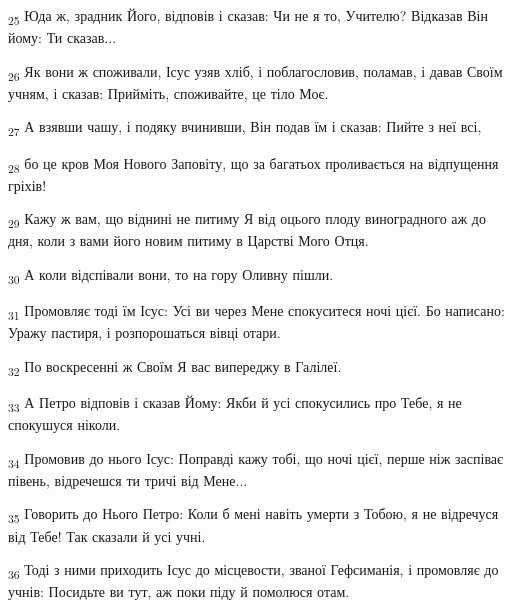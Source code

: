 \begin{tcolorbox}
\textsubscript{25} Юда ж, зрадник Його, відповів і сказав: Чи не я то, Учителю? Відказав Він йому: Ти сказав...
\end{tcolorbox}
\begin{tcolorbox}
\textsubscript{26} Як вони ж споживали, Ісус узяв хліб, і поблагословив, поламав, і давав Своїм учням, і сказав: Прийміть, споживайте, це тіло Моє.
\end{tcolorbox}
\begin{tcolorbox}
\textsubscript{27} А взявши чашу, і подяку вчинивши, Він подав їм і сказав: Пийте з неї всі,
\end{tcolorbox}
\begin{tcolorbox}
\textsubscript{28} бо це кров Моя Нового Заповіту, що за багатьох проливається на відпущення гріхів!
\end{tcolorbox}
\begin{tcolorbox}
\textsubscript{29} Кажу ж вам, що віднині не питиму Я від оцього плоду виноградного аж до дня, коли з вами його новим питиму в Царстві Мого Отця.
\end{tcolorbox}
\begin{tcolorbox}
\textsubscript{30} А коли відспівали вони, то на гору Оливну пішли.
\end{tcolorbox}
\begin{tcolorbox}
\textsubscript{31} Промовляє тоді їм Ісус: Усі ви через Мене спокуситеся ночі цієї. Бо написано: Уражу пастиря, і розпорошаться вівці отари.
\end{tcolorbox}
\begin{tcolorbox}
\textsubscript{32} По воскресенні ж Своїм Я вас випереджу в Галілеї.
\end{tcolorbox}
\begin{tcolorbox}
\textsubscript{33} А Петро відповів і сказав Йому: Якби й усі спокусились про Тебе, я не спокушуся ніколи.
\end{tcolorbox}
\begin{tcolorbox}
\textsubscript{34} Промовив до нього Ісус: Поправді кажу тобі, що ночі цієї, перше ніж заспіває півень, відречешся ти тричі від Мене...
\end{tcolorbox}
\begin{tcolorbox}
\textsubscript{35} Говорить до Нього Петро: Коли б мені навіть умерти з Тобою, я не відречуся від Тебе! Так сказали й усі учні.
\end{tcolorbox}
\begin{tcolorbox}
\textsubscript{36} Тоді з ними приходить Ісус до місцевости, званої Гефсиманія, і промовляє до учнів: Посидьте ви тут, аж поки піду й помолюся отам.
\end{tcolorbox}
